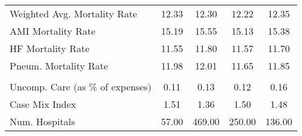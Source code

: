 \begin{table}[h]
\begin{tabular}[t]{lcccc}
\hspace{1em}Weighted Avg. Mortality Rate & 12.33 & 12.30 & 12.22 & 12.35\\
\hspace{1em}AMI Mortality Rate & 15.19 & 15.55 & 15.13 & 15.38\\
\hspace{1em}HF Mortality Rate & 11.55 & 11.80 & 11.57 & 11.70\\
\hspace{1em}Pneum. Mortality Rate & 11.98 & 12.01 & 11.65 & 11.85\\
\addlinespace[0.3em]
\multicolumn{5}{l}{\textbf{Other Outcome Variables}}\\
\hspace{1em}Uncomp. Care (as \% of expenses) & 0.11 & 0.13 & 0.12 & 0.16\\
\hspace{1em}Case Mix Index & 1.51 & 1.36 & 1.50 & 1.48\\
Num. Hospitals & 57.00 & 469.00 & 250.00 & 136.00\\
\bottomrule
\end{tabular}
\end{table}
